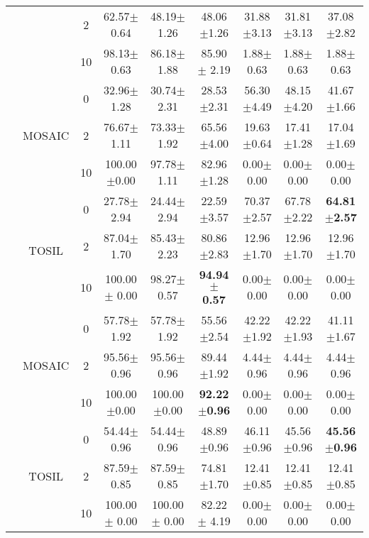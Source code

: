 \begin{table}[t]
{\begin{tabular}{|c|c|c|c|c|c|c|c|c|}
  \cline{3-9}
   &  & 2 & 62.57$\pm$0.64 & 48.19$\pm$1.26 & 48.06$\pm$1.26 & 31.88$\pm$3.13 & 31.81$\pm$3.13 & 37.08$\pm$2.82 \\ 
  \cline{3-9}
   &  & 10 & 98.13$\pm$ 0.63 & 86.18$\pm$ 1.88 & 85.90$\pm$ 2.19 & 1.88$\pm$ 0.63 & 1.88$\pm$ 0.63 & 1.88$\pm$ 0.63 \\ 
  \hhline{|=========|}
  \multirow{6}{*}{\rotatebox[origin=c]{90}{Nut-Assembly}} & \multirow{3}{*}{MOSAIC} & 0 & 32.96$\pm$1.28 & 30.74$\pm$2.31 & 28.53$\pm$2.31 & 56.30$\pm$4.49 & 48.15$\pm$4.20 & 41.67$\pm$1.66 \\ 
  \cline{3-9}
   &  & 2 & 76.67$\pm$1.11 & 73.33$\pm$1.92 & 65.56$\pm$4.00 & 19.63$\pm$0.64 & 17.41$\pm$1.28 & 17.04$\pm$1.69 \\ 
  \cline{3-9}
   &  & 10 & 100.00$\pm$0.00 & 97.78$\pm$1.11 & 82.96$\pm$1.28 & 0.00$\pm$0.00 & 0.00$\pm$0.00 & 0.00$\pm$0.00 \\ 
  \cline{2-9}
   & \multirow{3}{*}{TOSIL} & 0 & 27.78$\pm$2.94 & 24.44$\pm$2.94 & 22.59$\pm$3.57 & 70.37$\pm$2.57 & 67.78$\pm$2.22 & \textbf{64.81$\pm$2.57} \\ 
  \cline{3-9}
   &  & 2 & 87.04$\pm$1.70 & 85.43$\pm$2.23 & 80.86$\pm$2.83 & 12.96$\pm$1.70 & 12.96$\pm$1.70 & 12.96$\pm$1.70 \\ 
  \cline{3-9}
   &  & 10 & 100.00$\pm$ 0.00 & 98.27$\pm$ 0.57 & \textbf{94.94$\pm$ 0.57} & 0.00$\pm$ 0.00 & 0.00$\pm$ 0.00 & 0.00$\pm$ 0.00 \\ 
  \hhline{|=========|}
  \multirow{6}{*}{\rotatebox[origin=c]{90}{Stack-Block}} & \multirow{3}{*}{MOSAIC} & 0 & 57.78$\pm$1.92 & 57.78$\pm$1.92 & 55.56$\pm$2.54 & 42.22$\pm$1.92 & 42.22$\pm$1.93 & 41.11$\pm$1.67 \\ 
  \cline{3-9}
   &  & 2 & 95.56$\pm$0.96 & 95.56$\pm$0.96 & 89.44$\pm$1.92 & 4.44$\pm$0.96 & 4.44$\pm$0.96 & 4.44$\pm$0.96 \\ 
  \cline{3-9}
   &  & 10 & 100.00$\pm$0.00 & 100.00$\pm$0.00 & \textbf{92.22$\pm$0.96} & 0.00$\pm$0.00 & 0.00$\pm$0.00 & 0.00$\pm$0.00 \\ 
  \cline{2-9}
   & \multirow{3}{*}{TOSIL} & 0 & 54.44$\pm$0.96 & 54.44$\pm$0.96 & 48.89$\pm$0.96 & 46.11$\pm$0.96 & 45.56$\pm$0.96 & \textbf{45.56$\pm$0.96} \\ 
  \cline{3-9}
   &  & 2 & 87.59$\pm$0.85 & 87.59$\pm$0.85 & 74.81$\pm$1.70 & 12.41$\pm$0.85 & 12.41$\pm$0.85 & 12.41$\pm$0.85 \\ 
  \cline{3-9}
   &  & 10 & 100.00$\pm$ 0.00 & 100.00$\pm$ 0.00 & 82.22$\pm$ 4.19 & 0.00$\pm$ 0.00 & 0.00$\pm$ 0.00 & 0.00$\pm$ 0.00 \\ 

\end{tabular}}
\end{table}
